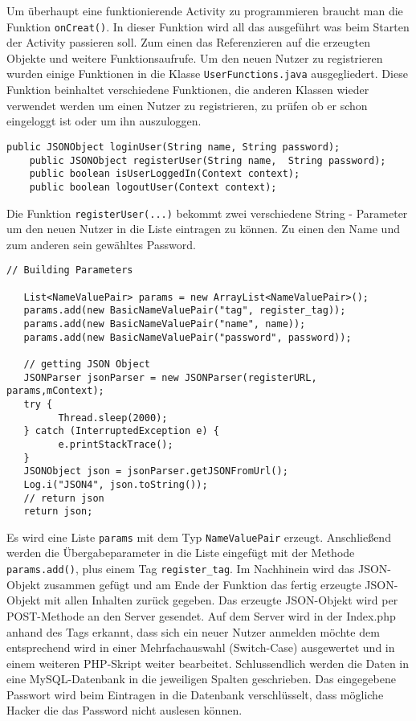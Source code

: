Um überhaupt eine funktionierende Activity zu programmieren braucht man die Funktion \texttt{onCreat()}. In dieser Funktion wird all das ausgeführt was beim 
Starten der Activity passieren soll. Zum einen das Referenzieren auf die erzeugten Objekte und weitere Funktionsaufrufe.
Um den neuen Nutzer zu registrieren wurden einige Funktionen in die Klasse \texttt{UserFunctions.java} ausgegliedert. Diese Funktion beinhaltet verschiedene Funktionen, die anderen Klassen wieder verwendet werden um einen Nutzer zu registrieren, zu prüfen ob er schon eingeloggt ist oder um ihn auszuloggen.
\begin{lstlisting}[caption={Objekt Erzeugung und Referenzierung},captionpos=b]
    public JSONObject loginUser(String name, String password);
    public JSONObject registerUser(String name,  String password);
    public boolean isUserLoggedIn(Context context);
    public boolean logoutUser(Context context);
\end{lstlisting}
Die Funktion \texttt{registerUser(...)} bekommt zwei verschiedene String - Parameter um den neuen Nutzer in die Liste eintragen zu können. Zu einen den Name und zum anderen sein gewähltes Password.
\begin{lstlisting}[caption={Objekt Erzeugung und Referenzierung},captionpos=b]
// Building Parameters

   List<NameValuePair> params = new ArrayList<NameValuePair>();
   params.add(new BasicNameValuePair("tag", register_tag));
   params.add(new BasicNameValuePair("name", name));
   params.add(new BasicNameValuePair("password", password));

   // getting JSON Object
   JSONParser jsonParser = new JSONParser(registerURL, params,mContext);
   try {
         Thread.sleep(2000);
   } catch (InterruptedException e) {
         e.printStackTrace();
   }
   JSONObject json = jsonParser.getJSONFromUrl();
   Log.i("JSON4", json.toString());
   // return json
   return json;
\end{lstlisting}
Es wird eine Liste \texttt{params} mit dem Typ \texttt{NameValuePair} erzeugt. Anschließend werden die Übergabeparameter in die Liste eingefügt mit der Methode \texttt{params.add()}, plus einem Tag \texttt{register_tag}.  Im Nachhinein wird das JSON-Objekt zusammen gefügt und am Ende der Funktion das fertig erzeugte JSON-Objekt mit allen Inhalten zurück gegeben.
Das erzeugte JSON-Objekt wird per POST-Methode an den Server gesendet. Auf dem Server wird in der Index.php anhand des Tags erkannt, dass sich ein neuer Nutzer anmelden möchte dem entsprechend wird in einer Mehrfachauswahl (Switch-Case) ausgewertet und in einem weiteren PHP-Skript weiter bearbeitet. Schlussendlich werden die Daten in eine MySQL-Datenbank in die jeweiligen Spalten geschrieben. Das eingegebene Passwort wird  beim Eintragen in die Datenbank verschlüsselt, dass mögliche Hacker die das Password nicht auslesen können.
